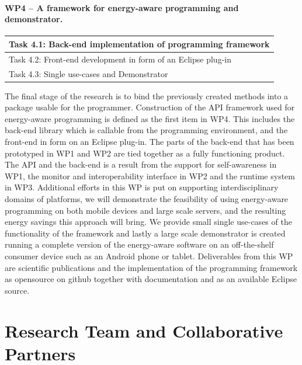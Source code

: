 \documentclass{article}
\begin{document}
\paragraph{WP4 -- A framework for energy-aware programming and demonstrator.}
\begin{table}
\vspace{-0.4cm}
\small
\begin{tabular}{ | l |}
\hline
Task 4.1: Back-end implementation of programming framework\\ \hline
Task 4.2: Front-end development in form of an Eclipse plug-in \\ \hline
Task 4.3: Single use-cases and Demonstrator\\ \hline
\end{tabular}
\vspace{-0.3cm}
\end{table}
The final stage of the research is to bind the previously created methods into a package usable for the programmer.
Construction of the API framework used for energy-aware programming is defined as the first item in WP4.
This includes the back-end library which is callable from the programming environment, and the front-end in form on an Eclipse plug-in.
The parts of the back-end that has been prototyped in WP1 and WP2 are tied together as a fully functioning product.
The API and the back-end is a result from the support for self-awareness in WP1, the monitor and interoperability interface in WP2 and the runtime system in WP3.
Additional efforts in this WP is put on supporting interdisciplinary domains of platforms, we will demonstrate the feasibility of using energy-aware programming on both mobile devices and large scale servers,
and the resulting energy savings this approach will bring.
We provide small single use-cases of the functionality of the framework and lastly a large scale demonstrator is created running a complete version of the energy-aware software on an off-the-shelf consumer device such as an Android phone or tablet.
Deliverables from this WP are scientific publications and the implementation of the programming framework as opensource on github together with documentation and as an available Eclipse source.

\section{Research Team and Collaborative Partners}
\end{document}
